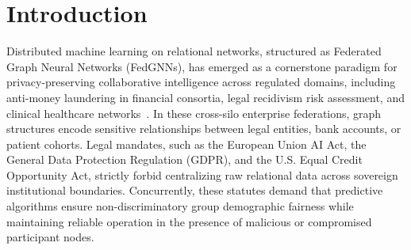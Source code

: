 \section{Introduction}
\label{sec:introduction}

Distributed machine learning on relational networks, structured as Federated Graph Neural Networks (FedGNNs), has emerged as a cornerstone paradigm for privacy-preserving collaborative intelligence across regulated domains, including anti-money laundering in financial consortia, legal recidivism risk assessment, and clinical healthcare networks~\citep{mcmahan2017communication, kipf2016semi, velickovic2017graph, kairouz2021advances}. In these cross-silo enterprise federations, graph structures encode sensitive relationships between legal entities, bank accounts, or patient cohorts. Legal mandates, such as the European Union AI Act, the General Data Protection Regulation (GDPR), and the U.S. Equal Credit Opportunity Act, strictly forbid centralizing raw relational data across sovereign institutional boundaries. Concurrently, these statutes demand that predictive algorithms ensure non-discriminatory group demographic fairness while maintaining reliable operation in the presence of malicious or compromised participant nodes.

